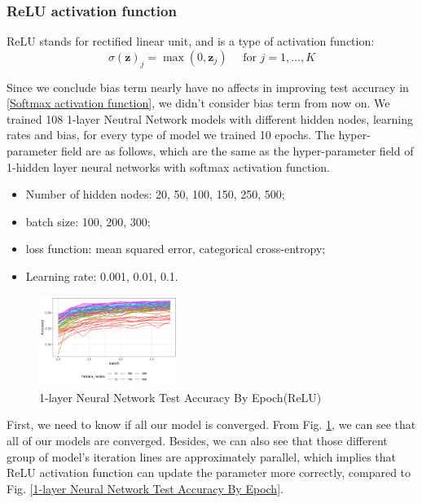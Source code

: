 \documentclass[conference]{IEEEtran}
\begin{document}
\subsubsection{ReLU activation function}
ReLU\cite{li2017convergence} stands for rectified linear unit, and is a type of activation function:
$$\sigma(\mathbf{z})_j=\max (0,\mathbf{z}_j)\quad \text { for } j=1, \ldots, K$$

Since we conclude bias term nearly have no affects in improving test accuracy in \ref{Softmax activation function}, we didn't consider bias term from now on. We trained 108 1-layer Neutral Network models with different hidden nodes, learning rates and bias, for every type of model we trained 10 epochs. The hyper-parameter field are as follows, which are the same as the hyper-parameter field of 1-hidden layer neural networks with softmax activation function.
\begin{itemize}
  \item Number of hidden nodes: 20, 50, 100, 150, 250, 500;
  \item batch size: 100, 200, 300;
  \item loss function: mean squared error, categorical cross-entropy;
  \item Learning rate: 0.001, 0.01, 0.1.
\end{itemize}

\begin{figure}[htbp]
\centerline{\includegraphics[width=0.4\textwidth]{figure/91-layer Neural Network Test Accuracy By Epoch.png}}
\caption{1-layer Neural Network Test Accuracy By Epoch(ReLU)}
\label{1-layer Neural Network Test Accuracy By Epoch(ReLU)}
\end{figure}
First, we need to know if all our model is converged. From Fig. \ref{1-layer Neural Network Test Accuracy By Epoch(ReLU)}, we can see that all of our models are converged. Besides, we can also see that those different group of model's iteration lines are approximately parallel, which implies that ReLU activation function can update the parameter more correctly, compared to Fig. \ref{1-layer Neural Network Test Accuracy By Epoch}.
\end{document}

